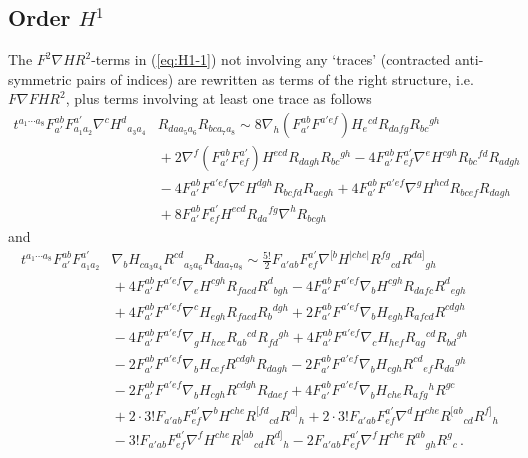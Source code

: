 \documentclass[a4paper,11pt]{article}
\begin{document}
\subsection{Order \texorpdfstring{$H^1$}{H**1}}\label{app:B}
The $F^2\nabla HR^2$-terms in (\ref{eq:H1-1}) not involving any `traces' (contracted anti-symmetric pairs of indices) are rewritten as terms of the right structure, i.e. $F\nabla FHR^2$, plus terms involving at least one trace as follows
\begin{equation}
\begin{aligned}
t^{a_1\cdots a_8}F_{a'}^{ab}F^{a'}_{a_1a_2}\nabla^cH^d{}_{a_3a_4}&R_{daa_5a_6}R_{bca_7a_8}
\sim
8\nabla_h(F_{a'}^{ab}F^{a'ef})H_e{}^{cd}R_{dafg}R_{bc}{}^{gh}
\\
&{}
+2\nabla^f(F_{a'}^{ab}F^{a'}_{ef})H^{ecd}R_{dagh}R_{bc}{}^{gh}
-4F_{a'}^{ab}F^{a'}_{ef}\nabla^eH^{cgh}R_{bc}{}^{fd}R_{adgh}
\\
&{}
-4F_{a'}^{ab}F^{a'ef}\nabla^cH^{dgh}R_{bcfd}R_{aegh}
+4F_{a'}^{ab}F^{a'ef}\nabla^gH^{hcd}R_{bcef}R_{dagh}
\\
&{}
+8F_{a'}^{ab}F^{a'}_{ef}H^{ecd}R_{da}{}^{fg}\nabla^hR_{bcgh}
\end{aligned}
\end{equation}
and
\begin{equation}
\begin{aligned}
t^{a_1\cdots a_8}F_{a'}^{ab}F^{a'}_{a_1a_2}&\nabla_bH_{ca_3a_4}R^{cd}{}_{a_5a_6}R_{daa_7a_8}
\sim
\frac{5!}{2}F_{a'ab}F^{a'}_{ef}\nabla^{[b}H^{|che|}R^{fg}{}_{cd}R^{da]}{}_{gh}%
\\
&{}
+4F_{a'}^{ab}F^{a'ef}\nabla_eH^{cgh}R_{facd}R^d{}_{bgh}%
-4F_{a'}^{ab}F^{a'ef}\nabla_bH^{cgh}R_{dafc}R^d{}_{egh}%
\\
&{}
+4F_{a'}^{ab}F^{a'ef}\nabla^cH_{egh}R_{facd}R_b{}^{dgh}%
%
+2F_{a'}^{ab}F^{a'ef}\nabla_bH_{egh}R_{afcd}R^{cdgh}%
\\
&{}
%
-4F_{a'}^{ab}F^{a'ef}\nabla_gH_{hce}R_{ab}{}^{cd}R_{fd}{}^{gh}%
+4F_{a'}^{ab}F^{a'ef}\nabla_cH_{hef}R_{ag}{}^{cd}R_{bd}{}^{gh}%
\\
&{}
-2F_{a'}^{ab}F^{a'ef}\nabla_bH_{cef}R^{cdgh}R_{dagh}%
-2F_{a'}^{ab}F^{a'ef}\nabla_bH_{cgh}R^{cd}{}_{ef}R_{da}{}^{gh}%
\\
&{}
-2F_{a'}^{ab}F^{a'ef}\nabla_bH_{cgh}R^{cdgh}R_{daef}%
%
+4F_{a'}^{ab}F^{a'ef}\nabla_bH_{che}R_{afg}{}^hR^{gc}%
\\
&{}
+2\cdot3!F_{a'ab}F^{a'}_{ef}\nabla^bH^{che}R^{[fd}{}_{cd}R^{a]}{}_h%
+2\cdot3!F_{a'ab}F^{a'}_{ef}\nabla^dH^{che}R^{[ab}{}_{cd}R^{f]}{}_h%
\\
&{}
-3!F_{a'ab}F^{a'}_{ef}\nabla^fH^{che}R^{[ab}{}_{cd}R^{d]}{}_h%
-2F_{a'ab}F^{a'}_{ef}\nabla^fH^{che}R^{ab}{}_{gh}R^g{}_c\,.
\end{aligned}
\end{equation}
\end{document}
